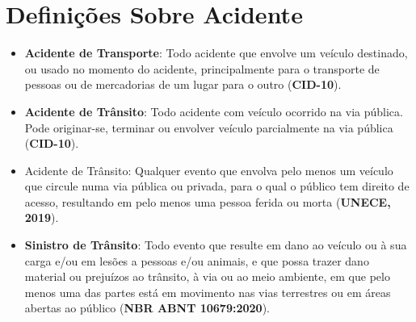 \documentclass[output=paper,colorlinks,citecolor=green]{langscibook}
\begin{document}
\section{Definições Sobre Acidente}

\begin{itemize}
\item \textbf{Acidente de Transporte}: Todo acidente que envolve um veículo destinado, ou usado no momento do acidente, principalmente para o transporte de pessoas ou de mercadorias de um lugar para o outro (\textbf{CID-10}). 
\item \textbf{Acidente de Trânsito}: Todo acidente com veículo ocorrido na via pública. Pode originar-se, terminar ou envolver veículo parcialmente na via pública (\textbf{CID-10}). 
\item Acidente de Trânsito: Qualquer evento que envolva pelo menos um veículo que circule numa via pública ou privada, para o qual o público tem direito de acesso, resultando em pelo menos uma pessoa ferida ou morta (\textbf{UNECE, 2019}). 
\item \textbf{Sinistro de Trânsito}: Todo evento que resulte em dano ao veículo ou à sua carga e/ou em lesões a pessoas e/ou animais, e que possa trazer dano material ou prejuízos ao trânsito, à via ou ao meio ambiente, em que pelo menos uma das partes está em movimento nas vias terrestres ou em áreas abertas ao público (\textbf{NBR ABNT 10679:2020}).
\end{itemize}
\end{document}
